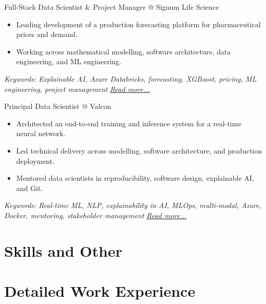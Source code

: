 \documentclass[11pt,a4paper]{moderncv}
\begin{document}
\large{Full-Stack Data Scientist \& Project Manager @ Signum Life Science}
\normalsize
\begin{itemize}
    \item Leading development of a production forecasting platform for pharmaceutical prices and demand.
    \item Working across mathematical modelling, software architecture, data engineering, and ML engineering.
\end{itemize}
{\footnotesize\textit{Keywords: Explainable AI, Azure Databricks, forecasting, XGBoost, pricing, ML engineering, project management}}
\hfill{\small{\textit{\hyperref[sec:signum]{Read more...}}}}

\large{Principal Data Scientist @ Valcon}
\normalsize
\begin{itemize}
    \item Architected an end-to-end training and inference system for a real-time neural network.
    \item Led technical delivery across modelling, software architecture, and production deployment.
    \item Mentored data scientists in reproducibility, software design, explainable AI, and Git.
\end{itemize}
{\footnotesize\textit{Keywords: Real-time ML, NLP, explainability in AI, MLOps, multi-modal, Azure, Docker, mentoring, stakeholder management}}
\hfill{\small{\textit{\hyperref[sec:valcon]{Read more...}}}}

\section{Skills and Other}
\normalsize
{}

\newpage

\section{Detailed Work Experience}
\end{document}
